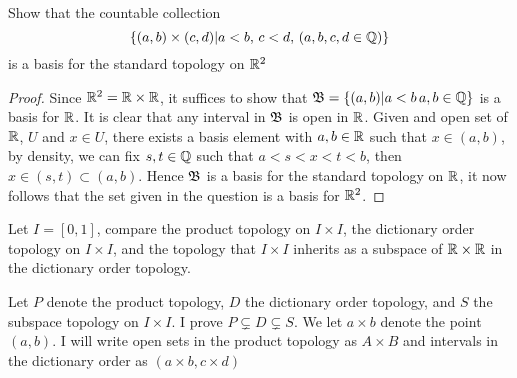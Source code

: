 \question 
Show that the countable collection 
\[\{(a, b) \times (c, d) | a < b,  \, c < d, \, (a, b, c, d \in \mathbb{Q})\}\]
is a basis for the standard topology on $\mathbb{R}^2$

\begin{proof}
    Since $\mathbb{R}^2 = \mathbb{R} \times \mathbb{R}$, it suffices to show that $\mathfrak{B} = \{(a, b) | a < b \, a, b \in \mathbb{Q}\}$ is a basis for $\mathbb{R}$. It is clear that any interval in $\mathfrak{B}$ is open in $\mathbb{R}$.
    Given and open set of $\mathbb{R}$, $U$ and $x \in U$, there exists a basis element with $a,b \in \mathbb{R}$ such that $x \in (a, b)$, by density, we can fix $s, t \in \mathbb{Q}$ such that $a < s < x < t < b$, 
    then $x \in (s, t) \subset (a, b)$. Hence $\mathfrak{B}$ is a basis for the standard topology on $\mathbb{R}$, it now follows that the set given in the question is a basis for $\mathbb{R}^2$. 
\end{proof}


\question 
Let $I = [0, 1]$, compare the product topology on $I \times I$, the dictionary order topology on $I \times I$, and the topology that $I \times I$ 
inherits as a subspace of $\mathbb{R} \times \mathbb{R}$ in the dictionary order topology. 

Let $P$ denote the product topology, $D$ the dictionary order topology, and $S$ the subspace topology on $I \times I$. 
I prove $P \subsetneq D \subsetneq S$. We let $a \times b$ denote the point $(a, b)$. I will write open sets in the 
product topology as $A \times B$ and intervals in the dictionary order as $(a \times b, c \times d)$

